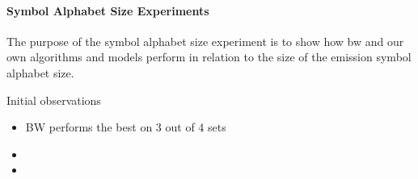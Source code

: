 \paragraph{Symbol Alphabet Size Experiments}
The purpose of the symbol alphabet size experiment is to show how \gls{bw} and our own algorithms and models perform in relation to the size of the emission symbol alphabet size.

	
	
Initial observations
\begin{itemize}
\item BW performs the best on 3 out of 4 sets
\item 
\item 
\end{itemize}	
	

